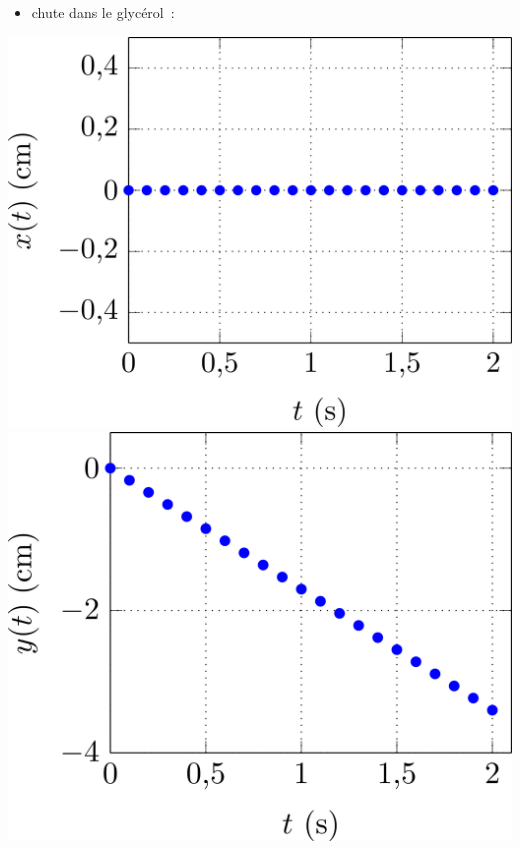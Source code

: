 \documentclass[../../main/main.tex]{subfiles}
\begin{document}
\begin{minipage}{0.31\linewidth}
	\begin{itemize}
		\item chute dans le glycérol~:
	\end{itemize}
	\begin{center}
		\includegraphics[width=\linewidth]{x_glyc}
		\includegraphics[width=\linewidth]{y_glyc}
	\end{center}
\end{minipage}
\hfill
\end{document}
